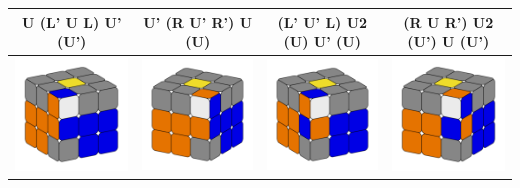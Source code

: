 \documentclass[12pt, a3paper]{article}
\newcommand{\scale}{1}
\begin{document}
\begin{center}
\begin{longtable}{c|c||c|c}
	U (L' U L) U' (U') & U' (R U' R') U (U) & (L' U' L) U2 (U) U' (U) & (R U R') U2 (U') U (U') \\
	\hline
	\hline
	\includegraphics[scale=\scale]{9_left} & \includegraphics[scale=\scale]{9_right}  &  \includegraphics[scale=\scale]{10_left} & \includegraphics[scale=\scale]{10_right} \\

\end{longtable}
\end{center}
\end{document}
